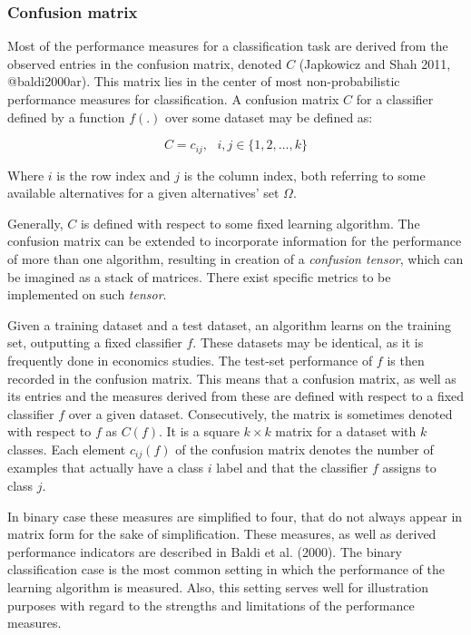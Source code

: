 \documentclass[11pt,]{article}
\begin{document}
\hypertarget{confusion-matrix}{%
\subsubsection{Confusion matrix}\label{confusion-matrix}}

Most of the performance measures for a classification task are derived
from the observed entries in the confusion matrix, denoted \(C\)
(Japkowicz and Shah 2011, @baldi2000ar). This matrix lies in the center
of most non-probabilistic performance measures for classification. A
confusion matrix \(C\) for a classifier defined by a function \(f(.)\)
over some dataset may be defined as:

\begin{equation}
C = {c_{ij}}, \text{  } i, j \in \{1, 2, \dots, k\}
\end{equation}

Where \(i\) is the row index and \(j\) is the column index, both
referring to some available alternatives for a given alternatives' set
\(\Omega\).

Generally, \(C\) is defined with respect to some fixed learning
algorithm. The confusion matrix can be extended to incorporate
information for the performance of more than one algorithm, resulting in
creation of a \emph{confusion tensor}, which can be imagined as a stack
of matrices. There exist specific metrics to be implemented on such
\emph{tensor}.

Given a training dataset and a test dataset, an algorithm learns on the
training set, outputting a fixed classifier \(f\). These datasets may be
identical, as it is frequently done in economics studies. The test-set
performance of \(f\) is then recorded in the confusion matrix. This
means that a confusion matrix, as well as its entries and the measures
derived from these are defined with respect to a fixed classifier \(f\)
over a given dataset. Consecutively, the matrix is sometimes denoted
with respect to \(f\) as \(C(f)\). It is a square \(k \times k\) matrix
for a dataset with \(k\) classes. Each element \(c_{ij}(f)\) of the
confusion matrix denotes the number of examples that actually have a
class \(i\) label and that the classifier \(f\) assigns to class \(j\).

In binary case these measures are simplified to four, that do not always
appear in matrix form for the sake of simplification. These measures, as
well as derived performance indicators are described in Baldi et al.
(2000). The binary classification case is the most common setting in
which the performance of the learning algorithm is measured. Also, this
setting serves well for illustration purposes with regard to the
strengths and limitations of the performance measures.
\end{document}
